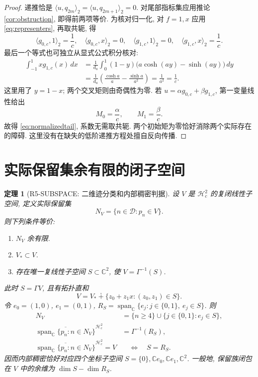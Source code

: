 \documentclass[UTF8,fontset=fandol,11pt,a4paper]{ctexart}
\newtheorem{theorem}{定理}[section]
\theoremstyle{definition}
\newcommand{\C}{\mathbb C}
\newcommand{\Hc}{\mathcal H_c^2}
\newcommand{\spn}{\operatorname{span}_{\C}}
\newcommand{\ip}[2]{\langle #1,#2\rangle_2}
\begin{document}
\begin{proof}
递推恰是 $\ip{u}{q_{2m}}=\ip{u}{q_{2m+1}}=0$.
对尾部指标集应用推论\ref{cor:obstruction}, 即得前两项等价.
为核对归一化, 对 $f=1,x$ 应用 \eqref{eq:representers}, 再取共轭, 得
\begin{equation}\label{eq:lowmoments}
\ip{g_{0,c}}1=\frac1c,\quad \ip{g_{0,c}}x=0,\quad
\ip{g_{1,c}}1=0,\quad \ip{g_{1,c}}x=\frac1c.
\end{equation}
最后一个等式也可独立从显式公式积分核对:
\begin{align*}
\int_{-1}^1xg_{1,c}(x)\,dx
&=\frac1{d_a}\int_0^1(1-y)\bigl(a\cosh(ay)-\sinh(ay)\bigr)\,dy\\
&=\frac1{d_a}\left(\frac{\cosh a}{a}-\frac{\sinh a}{a^2}\right)
=\frac1{a^2}=\frac1c.
\end{align*}
这里用了 $y=1-x$; 两个交叉矩则由奇偶性为零.
若 $u=\alpha g_{0,c}+\beta g_{1,c}$, 第一变量线性给出
\[
M_0=\frac\alpha c,\qquad M_1=\frac\beta c.
\]
故得 \eqref{eq:normalizedtail}, 系数无需取共轭.
两个初始矩为零恰好消除两个实际存在的障碍.
这里没有在缺失的低阶递推方程处擅自反向传播.
\end{proof}

\section{实际保留集余有限的闭子空间}
\label{sec:subspace}

\begin{theorem}[R5-SUBSPACE: 二维迹分类和内部稠密判据]\label{thm:subspace}
设 $V$ 是 $\Hc$ 的复闭线性子空间, 定义实际保留集
\[
N_V=\{n\in\mathcal D:p_n\in V\}.
\]
则下列条件等价:
\begin{enumerate}
\item $N_V$ 余有限.
\item $V_*\subset V$.
\item 存在唯一复线性子空间 $S\subset\C^2$, 使 $V=\Gamma^{-1}(S)$.
\end{enumerate}
此时 $S=\Gamma V$, 且有拓扑直和
\begin{equation}\label{eq:vs}
V=V_*\mathbin{\dotplus}\{z_0+z_1x:(z_0,z_1)\in S\}.
\end{equation}
令 $e_0=(1,0)$, $e_1=(0,1)$,
$R_S=\spn\{e_j:j\in\{0,1\},\ e_j\in S\}$. 则
\begin{align}
N_V&=\{n\ge4\}\cup\{j\in\{0,1\}:e_j\in S\},\label{eq:actualN}\\
\overline{\spn\{p_n:n\in N_V\}}^{\Hc}&=\Gamma^{-1}(R_S),\label{eq:actualclosure}\\
\overline{\spn\{p_n:n\in N_V\}}^{\Hc}=V
&\quad\Longleftrightarrow\quad S=R_S.\label{eq:internaldensity}
\end{align}
因而内部稠密恰好对应四个坐标子空间
$S=\{0\},\C e_0,\C e_1,\C^2$.
一般地, 保留族闭包在 $V$ 中的余维为 $\dim S-\dim R_S$.
\end{theorem}
\end{document}
